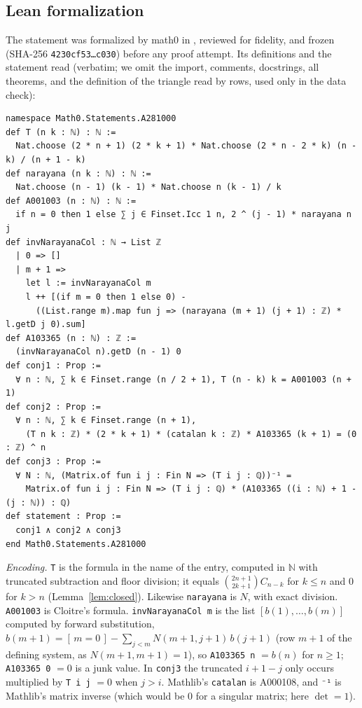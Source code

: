 \documentclass[11pt]{amsart}
\theoremstyle{plain}
\theoremstyle{definition}
\newcommand{\N}{\mathbb{N}}
\newcommand{\ib}[1]{[\,#1\,]}
\begin{document}
\subsection*{Lean formalization}
The statement was formalized by math0 in , reviewed for fidelity, and frozen (SHA-256 \texttt{4230cf53\ldots c030}) before any proof attempt. Its definitions and the statement read (verbatim; we omit the import, comments, docstrings, all theorems, and the definition  of the triangle read by rows, used only in the data check):
\begin{lstlisting}
namespace Math0.Statements.A281000
def T (n k : ℕ) : ℕ :=
  Nat.choose (2 * n + 1) (2 * k + 1) * Nat.choose (2 * n - 2 * k) (n - k) / (n + 1 - k)
def narayana (n k : ℕ) : ℕ :=
  Nat.choose (n - 1) (k - 1) * Nat.choose n (k - 1) / k
def A001003 (n : ℕ) : ℕ :=
  if n = 0 then 1 else ∑ j ∈ Finset.Icc 1 n, 2 ^ (j - 1) * narayana n j
def invNarayanaCol : ℕ → List ℤ
  | 0 => []
  | m + 1 =>
    let l := invNarayanaCol m
    l ++ [(if m = 0 then 1 else 0) -
      ((List.range m).map fun j => (narayana (m + 1) (j + 1) : ℤ) * l.getD j 0).sum]
def A103365 (n : ℕ) : ℤ :=
  (invNarayanaCol n).getD (n - 1) 0
def conj1 : Prop :=
  ∀ n : ℕ, ∑ k ∈ Finset.range (n / 2 + 1), T (n - k) k = A001003 (n + 1)
def conj2 : Prop :=
  ∀ n : ℕ, ∑ k ∈ Finset.range (n + 1),
    (T n k : ℤ) * (2 * k + 1) * (catalan k : ℤ) * A103365 (k + 1) = (0 : ℤ) ^ n
def conj3 : Prop :=
  ∀ N : ℕ, (Matrix.of fun i j : Fin N => (T i j : ℚ))⁻¹ =
    Matrix.of fun i j : Fin N => (T i j : ℚ) * (A103365 ((i : ℕ) + 1 - (j : ℕ)) : ℚ)
def statement : Prop :=
  conj1 ∧ conj2 ∧ conj3
end Math0.Statements.A281000
\end{lstlisting}
\emph{Encoding.} \texttt{T} is the formula in the name of the entry, computed in $\N$ with truncated subtraction and floor division; it equals $\binom{2n+1}{2k+1}C_{n-k}$ for $k\le n$ and $0$ for $k>n$ (Lemma~\ref{lem:closed}). Likewise \texttt{narayana} is $N$, with exact division. \texttt{A001003} is Cloitre's formula. \texttt{invNarayanaCol m} is the list $[b(1),\dots,b(m)]$ computed by forward substitution, $b(m+1)=\ib{m=0}-\sum_{j<m}N(m+1,j+1)\,b(j+1)$ (row $m+1$ of the defining system, as $N(m+1,m+1)=1$), so \texttt{A103365 n} $=b(n)$ for $n\ge1$; \texttt{A103365 0} $=0$ is a junk value. In \texttt{conj3} the truncated $i+1-j$ only occurs multiplied by \texttt{T i j} $=0$ when $j>i$. Mathlib's \texttt{catalan} is A000108, and \texttt{⁻¹} is Mathlib's matrix inverse (which would be $0$ for a singular matrix; here $\det=1$).
\end{document}
